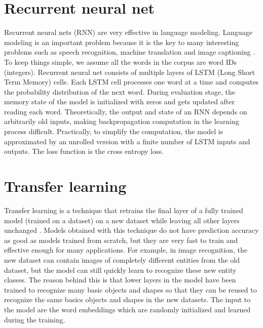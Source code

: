 \section{Recurrent neural net}
Recurrent neural nets (RNN) are very effective in language modeling.
Language modeling is an important problem because it is the key to many interesting problems such as speech recognition, machine translation and image captioning \cite{zaremba2014recurrent}.
To keep things simple, we assume all the words in the corpus are word IDs (integers).
Recurrent neural net consists of multiple layers of LSTM (Long Short Term Memory) cells. Each LSTM cell processes one word at a time and computes the probability distribution of the next word.
During evaluation stage, the memory state of the model is initialized with zeros and gets updated after reading each word.
Theoretically, the output and state of an RNN depends on arbitrarily old inputs, making backpropagation computation in the learning process difficult.
Practically, to simplify the computation, the model is approximated by an unrolled version with a finite number of LSTM inputs and outputs.
The loss function is the cross entropy loss.

\section{Transfer learning}
Transfer learning is a technique that retrains the final layer of a fully trained model (trained on a dataset) on a new dataset while leaving all other layers unchanged \cite{donahue2014decaf}. Models obtained with this technique do not have prediction accuracy as good as models trained from scratch, but they are very fast to train and effective enough for many applications. For example, in image recognition, the new dataset can contain images of completely different entities from the old dataset, but the model can still quickly learn to recognize these new entity classes. The reason behind this is that lower layers in the model have been trained to recognize many basic objects and shapes so that they can be reused to recognize the same basics objects and shapes in the new datasets.
The input to the model are the word embeddings which are randomly initialized and learned during the training.
